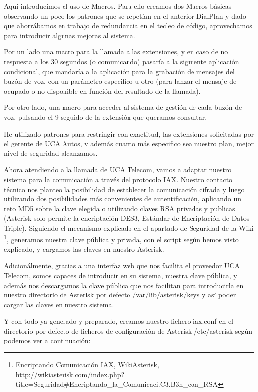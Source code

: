 Aquí introducimos el uso de Macros. Para ello creamos dos Macros básicas observando un poco los patrones que se repetían en el anterior DialPlan y dado que ahorrábamos en trabajo de redundancia en el tecleo de código, aprovechamos para introducir algunas mejoras al sistema.

Por un lado una macro para la llamada a las extensiones, y en caso de no respuesta a los 30 segundos (o comunicando) pasaría a la siguiente aplicación condicional, que mandaría a la aplicación para la grabación de mensajes del buzón de voz, con un parámetro especifico u otro (para lanzar el mensaje de ocupado o no disponible en función del resultado de la llamada).

Por otro lado, una macro para acceder al sistema de gestión de cada buzón de voz, pulsando el 9 seguido de la extensión que queramos consultar.

He utilizado patrones para restringir con exactitud, las extensiones solicitadas por el gerente de UCA Autos, y además cuanto más especifico sea nuestro plan, mejor nivel de seguridad alcanzamos.

Ahora atendiendo a la llamada de UCA Telecom, vamos a adaptar nuestro sistema para la comunicación a través del protocolo IAX. Nuestro contacto técnico nos planteo la posibilidad de establecer la comunicación cifrada y luego utilizando dos posibilidades más convenientes de autentificación, aplicando un reto MD5 sobre la clave elegida o utilizando claves RSA privadas y publicas (Asterisk solo permite la encriptación DES3, Estándar de Encriptación de Datos Triple). Siguiendo el mecanismo explicado en el apartado de Seguridad de la Wiki \footnote{Encriptando Comunicación IAX, WikiAsterisk, \\http://wikiasterisk.com/index.php?title=Seguridad\#Encriptando\_la\_Comunicaci.C3.B3n\_con\_RSA}, generamos nuestra clave pública y privada, con el script según hemos visto explicado, y cargamos las claves en nuestro Asterisk.

Adicionálmente, gracias a una interfaz web que nos facilita el proveedor UCA Telecom, somos capaces de introducir en su sistema, nuestra clave pública, y además nos descargamos la clave pública que nos facilitan para introducirla en nuestro directorio de Asterisk por defecto /var/lib/asterisk/keys y así poder cargar las claves en nuestro sistema.

Y con todo ya generado y preparado, creamos nuestro fichero iax.conf en el directorio por defecto de ficheros de configuración de Asterisk /etc/asterisk según podemos ver a continuación:

